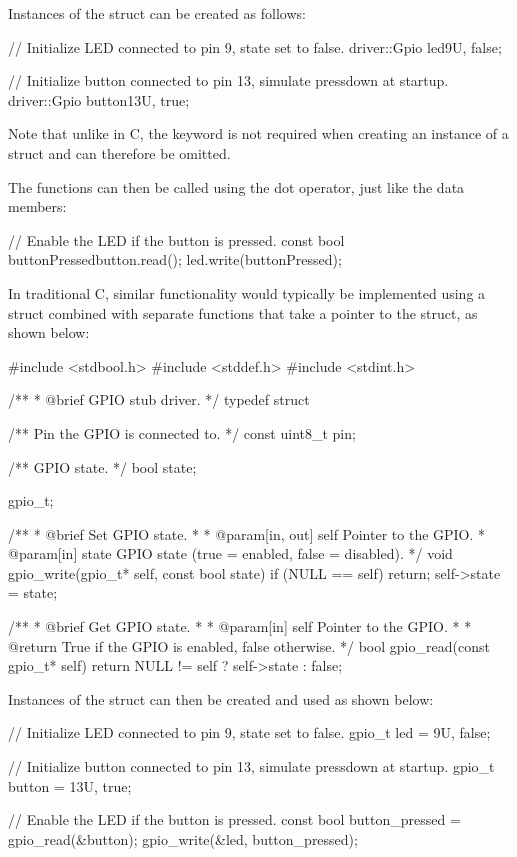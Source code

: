 Instances of the struct can be created as follows:

\begin{cppcode}
// Initialize LED connected to pin 9, state set to false.
driver::Gpio led{9U, false};

// Initialize button connected to pin 13, simulate pressdown at startup.
driver::Gpio button{13U, true};
\end{cppcode}

\noindent Note that unlike in C, the keyword  is not required when creating an
instance of a struct and can therefore be omitted.

The functions can then be called using the dot operator, just like the data members:

\begin{cppcode}
// Enable the LED if the button is pressed.
const bool buttonPressed{button.read()};
led.write(buttonPressed);
\end{cppcode}

\noindent In traditional C, similar functionality would typically be implemented using a struct
combined with separate functions that take a pointer to the struct, as shown below:

\begin{ccode}
#include <stdbool.h>
#include <stddef.h>
#include <stdint.h>

/**
 * @brief GPIO stub driver.
 */
typedef struct
{
    /** Pin the GPIO is connected to. */
    const uint8_t pin;

    /** GPIO state. */
    bool state;
} gpio_t;

/**
 * @brief Set GPIO state.
 *
 * @param[in, out] self Pointer to the GPIO.
 * @param[in] state GPIO state (true = enabled, false = disabled).
 */
void gpio_write(gpio_t* self, const bool state)
{
    if (NULL == self) { return; }
    self->state = state;
}

/**
 * @brief Get GPIO state.
 *
 * @param[in] self Pointer to the GPIO.
 *
 * @return True if the GPIO is enabled, false otherwise.
 */
bool gpio_read(const gpio_t* self)
{
    return NULL != self ? self->state : false;
}
\end{ccode}

\noindent Instances of the struct can then be created and used as shown below:

\begin{ccode}
// Initialize LED connected to pin 9, state set to false.
gpio_t led = {9U, false};

// Initialize button connected to pin 13, simulate pressdown at startup.
gpio_t button = {13U, true};

// Enable the LED if the button is pressed.
const bool button_pressed = gpio_read(&button);
gpio_write(&led, button_pressed);
\end{ccode}

